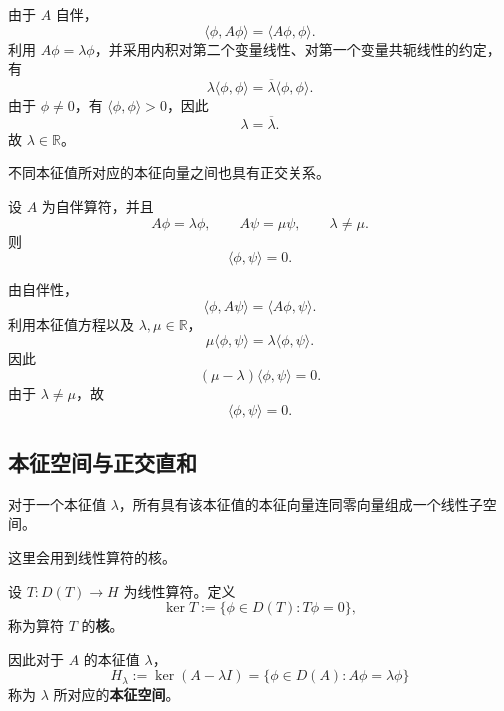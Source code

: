 \documentclass[UTF8,a4paper,11pt,openany]{ctexbook}
\begin{document}
\begin{proofblock}
由于 $A$ 自伴，
\[
\langle\phi,A\phi\rangle
=
\langle A\phi,\phi\rangle.
\]
利用 $A\phi=\lambda\phi$，并采用内积对第二个变量线性、对第一个变量共轭线性的约定，有
\[
\lambda\langle\phi,\phi\rangle
=
\overline{\lambda}\langle\phi,\phi\rangle.
\]
由于 $\phi\neq0$，有 $\langle\phi,\phi\rangle>0$，因此
\[
\lambda=\overline{\lambda}.
\]
故 $\lambda\in\mathbb R$。
\end{proofblock}

不同本征值所对应的本征向量之间也具有正交关系。

\begin{proposition}[不同本征值的本征向量正交]
设 $A$ 为自伴算符，并且
\[
A\phi=\lambda\phi,
\qquad
A\psi=\mu\psi,
\qquad
\lambda\neq\mu.
\]
则
\begin{equation}
    \langle\phi,\psi\rangle=0.
\end{equation}
\end{proposition}

\begin{proofblock}
由自伴性，
\[
\langle\phi,A\psi\rangle
=
\langle A\phi,\psi\rangle.
\]
利用本征值方程以及 $\lambda,\mu\in\mathbb R$，
\[
\mu\langle\phi,\psi\rangle
=
\lambda\langle\phi,\psi\rangle.
\]
因此
\[
(\mu-\lambda)\langle\phi,\psi\rangle=0.
\]
由于 $\lambda\neq\mu$，故
\[
\langle\phi,\psi\rangle=0.
\]
\end{proofblock}

\subsection{本征空间与正交直和}

对于一个本征值 $\lambda$，所有具有该本征值的本征向量连同零向量组成一个线性子空间。

这里会用到线性算符的核。

\begin{definition}[算符的核]
设 $T:D(T)\to H$ 为线性算符。定义
\begin{equation}
    \ker T
    :=
    \{\phi\in D(T):T\phi=0\},
\end{equation}
称为算符 $T$ 的\textbf{核}。
\end{definition}

因此对于 $A$ 的本征值 $\lambda$，
\begin{equation}
    H_\lambda
    :=
    \ker(A-\lambda I)
    =
    \{\phi\in D(A):A\phi=\lambda\phi\}
\end{equation}
称为 $\lambda$ 所对应的\textbf{本征空间}。
\end{document}
